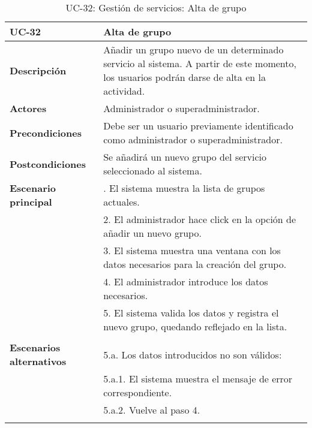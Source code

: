\begin{table}[H]
  \begin{center}
    \begin{tabularx}{16.4cm}{|l|X|}
      \hline
      \textbf{UC-32} & \textbf{Alta de grupo}\\
      \hline
      \textbf{Descripción} & Añadir un grupo nuevo de un determinado servicio al sistema. A partir de este momento, los usuarios podrán darse de alta en la actividad.\\
      \hline
      \textbf{Actores} & Administrador o superadministrador.\\
      \hline
      \textbf{Precondiciones} & Debe ser un usuario previamente identificado como administrador o superadministrador.\\
      \hline
      \textbf{Postcondiciones} & Se añadirá un nuevo grupo del servicio seleccionado al sistema.\\
      \hline
      \textbf{Escenario principal} & \smallskip 1. El sistema muestra la lista de grupos actuales.\\
      & 2. El administrador hace click en la opción de añadir un nuevo grupo.\\
      & 3. El sistema muestra una ventana con los datos necesarios para la creación del grupo.\\
      & 4. El administrador introduce los datos necesarios.\\
      & 5. El sistema valida los datos y registra el nuevo grupo, quedando reflejado en la lista.\\
      & \\
      \hline
      \textbf{Escenarios alternativos} & \smallskip 5.a. Los datos introducidos no son válidos:\\
      & \hspace{0.3cm} 5.a.1. El sistema muestra el mensaje de error correspondiente.\\
      & \hspace{0.3cm} 5.a.2. Vuelve al paso 4.\\
      & \\
      \hline
    \end{tabularx}
    \caption{UC-32: Gestión de servicios: Alta de grupo}
  \end{center}
\end{table}


